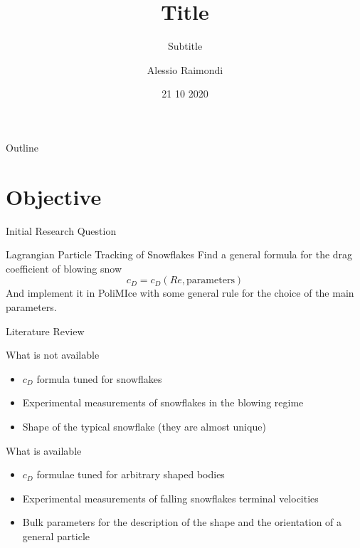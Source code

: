 \documentclass{beamer}
\title{Title}
\subtitle{Subtitle}
\author{Alessio Raimondi}
\date{21 10 2020}
\begin{document}
    \begin{frame}
        \maketitle
    \end{frame}
    
    \begin{frame}{Outline}
      \tableofcontents
    \end{frame}
    
\section{Objective}    
    \begin{frame}{Initial Research Question}
        \begin{block}{Lagrangian Particle Tracking of Snowflakes}
        	Find a general formula for the drag coefficient of blowing snow
        	\begin{equation*}
        		c_D = c_D (Re, \text{parameters})
        	\end{equation*}
        	And implement it in PoliMIce with some general rule for the choice of the main parameters.
        \end{block}
    \end{frame}
    
    \begin{frame}{Literature Review}
    	\begin{alertblock}{What is not available}
    		\begin{itemize}
    			\item $ c_D $ formula tuned for snowflakes
    			\item Experimental measurements of snowflakes in the blowing regime
    			\item Shape of the typical snowflake (they are almost unique)
    		\end{itemize}
    	\end{alertblock}
    
		\begin{exampleblock}{What is available}
			\begin{itemize}
				\item $ c_D $ formulae tuned for arbitrary shaped bodies
				\item Experimental measurements of falling snowflakes terminal velocities
				\item Bulk parameters for the description of the shape and the orientation of a general particle
			\end{itemize}
		\end{exampleblock}
    \end{frame}
\end{document}
